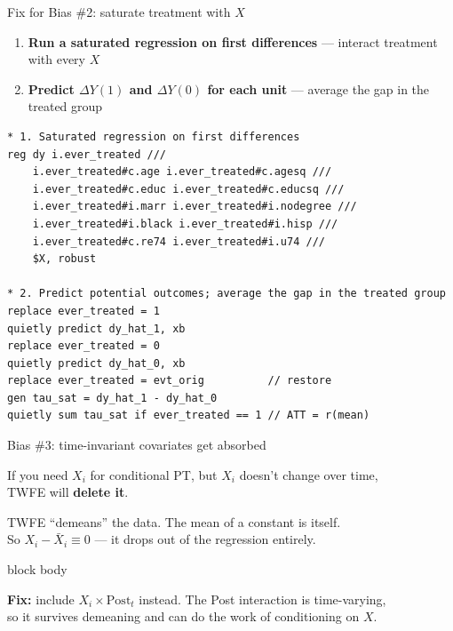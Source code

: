 \documentclass[aspectratio=169,11pt]{beamer}
\newcommand{\emphbox}[1]{%
  \begin{beamercolorbox}[rounded=true,sep=7pt,wd=\linewidth]{block body}%
    \small\color{slate}\raggedright #1%
  \end{beamercolorbox}}
\begin{document}
\begin{frame}[fragile]{Fix for Bias \#2: saturate treatment with $X$}
\vspace{0.2em}
\begin{enumerate}\setlength\itemsep{0.4em}\small
  \item \textbf{Run a saturated regression on first differences} --- interact treatment with every $X$
  \item \textbf{Predict $\Delta Y(1)$ and $\Delta Y(0)$ for each unit} --- average the gap in the treated group
\end{enumerate}
\vspace{0.3em}
\begin{lstlisting}[language={[ANSI]C},basicstyle=\ttfamily\tiny]
* 1. Saturated regression on first differences
reg dy i.ever_treated ///
    i.ever_treated#c.age i.ever_treated#c.agesq ///
    i.ever_treated#c.educ i.ever_treated#c.educsq ///
    i.ever_treated#i.marr i.ever_treated#i.nodegree ///
    i.ever_treated#i.black i.ever_treated#i.hisp ///
    i.ever_treated#c.re74 i.ever_treated#i.u74 ///
    $X, robust

* 2. Predict potential outcomes; average the gap in the treated group
replace ever_treated = 1
quietly predict dy_hat_1, xb
replace ever_treated = 0
quietly predict dy_hat_0, xb
replace ever_treated = evt_orig          // restore
gen tau_sat = dy_hat_1 - dy_hat_0
quietly sum tau_sat if ever_treated == 1 // ATT = r(mean)
\end{lstlisting}
\end{frame}


\begin{frame}{Bias \#3: time-invariant covariates get absorbed}
\vspace{0.6em}
\begin{center}
If you need $X_i$ for conditional PT, but $X_i$ doesn't change over time,\\
TWFE will \textbf{delete it}.
\end{center}
\vspace{0.5em}
\begin{center}\color{warmgray}\small
TWFE ``demeans'' the data. The mean of a constant is itself.\\
So $X_i - \bar{X}_i \equiv 0$ --- it drops out of the regression entirely.
\end{center}
\vspace{0.5em}
\emphbox{\textbf{Fix:} include $X_i \times \mathrm{Post}_t$ instead. \;The Post interaction is time-varying,\\
so it survives demeaning and can do the work of conditioning on $X$.}
\end{frame}
\end{document}
